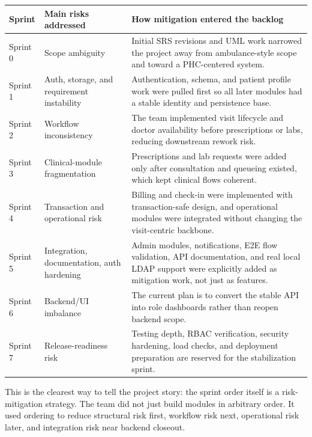\documentclass[11pt,a4paper]{article}
\begin{document}
\begin{center}
\begin{tabular}{|p{1.3cm}|p{4cm}|p{7.7cm}|}
\hline
\rowcolor{SoftBlue}
\textbf{Sprint} & \textbf{Main risks addressed} & \textbf{How mitigation entered the backlog} \\
\hline
Sprint 0 & Scope ambiguity & Initial SRS revisions and UML work narrowed the project away from ambulance-style scope and toward a PHC-centered system. \\
\hline
Sprint 1 & Auth, storage, and requirement instability & Authentication, schema, and patient profile work were pulled first so all later modules had a stable identity and persistence base. \\
\hline
Sprint 2 & Workflow inconsistency & The team implemented visit lifecycle and doctor availability before prescriptions or labs, reducing downstream rework risk. \\
\hline
Sprint 3 & Clinical-module fragmentation & Prescriptions and lab requests were added only after consultation and queueing existed, which kept clinical flows coherent. \\
\hline
Sprint 4 & Transaction and operational risk & Billing and check-in were implemented with transaction-safe design, and operational modules were integrated without changing the visit-centric backbone. \\
\hline
Sprint 5 & Integration, documentation, auth hardening & Admin modules, notifications, E2E flow validation, API documentation, and real local LDAP support were explicitly added as mitigation work, not just as features. \\
\hline
Sprint 6 & Backend/UI imbalance & The current plan is to convert the stable API into role dashboards rather than reopen backend scope. \\
\hline
Sprint 7 & Release-readiness risk & Testing depth, RBAC verification, security hardening, load checks, and deployment preparation are reserved for the stabilization sprint. \\
\hline
\end{tabular}
\end{center}

This is the clearest way to tell the project story: the sprint order itself is a risk-mitigation strategy. The team did not just build modules in arbitrary order. It used ordering to reduce structural risk first, workflow risk next, operational risk later, and integration risk near backend closeout.
\end{document}
